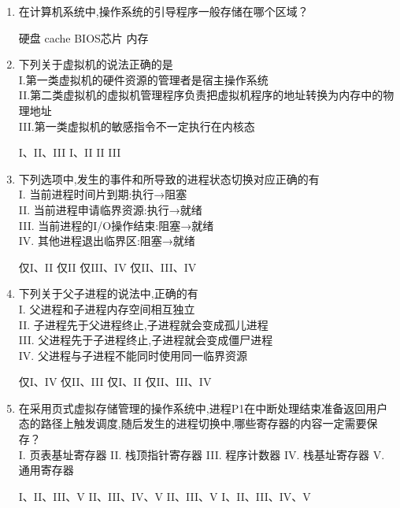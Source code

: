 \documentclass[12pt, a4paper, oneside, UTF8]{ctexbook}
\begin{document}
\begin{enumerate}
    \item 在计算机系统中,操作系统的引导程序一般存储在哪个区域？
    \begin{choices}
    \task 硬盘
    \task cache
    \task BIOS芯片
    \task 内存
    \end{choices}

    \item 下列关于虚拟机的说法正确的是\\
    I.第一类虚拟机的硬件资源的管理者是宿主操作系统\\
    II.第二类虚拟机的虚拟机管理程序负责把虚拟机程序的地址转换为内存中的物理地址\\
    III.第一类虚拟机的敏感指令不一定执行在内核态
    \begin{choices}
    \task I、II、III
    \task I、II
    \task II
    \task III
    \end{choices}

    \item 下列选项中,发生的事件和所导致的进程状态切换对应正确的有\\
    I. 当前进程时间片到期:执行→阻塞\\
    II. 当前进程申请临界资源:执行→就绪\\
    III. 当前进程的I/O操作结束:阻塞→就绪\\
    IV. 其他进程退出临界区:阻塞→就绪
    \begin{choices}
    \task 仅I、II
    \task 仅II
    \task 仅III、IV
    \task 仅II、III、IV
    \end{choices}

    \item 下列关于父子进程的说法中,正确的有\\
    I. 父进程和子进程内存空间相互独立\\
    II. 子进程先于父进程终止,子进程就会变成孤儿进程\\
    III. 父进程先于子进程终止,子进程就会变成僵尸进程\\
    IV. 父进程与子进程不能同时使用同一临界资源
    \begin{choices}
    \task 仅I、IV
    \task 仅II、III
    \task 仅I、II
    \task 仅II、III、IV
    \end{choices}

    \item 在采用页式虚拟存储管理的操作系统中,进程P1在中断处理结束准备返回用户态的路径上触发调度,随后发生的进程切换中,哪些寄存器的内容一定需要保存？\\
    I. 页表基址寄存器\quad
    II. 栈顶指针寄存器\quad
    III. 程序计数器\quad
    IV. 栈基址寄存器\quad
    V. 通用寄存器
    \begin{choices}[2]
    \task I、II、III、V
    \task II、III、IV、V
    \task II、III、V
    \task I、II、III、IV、V
    \end{choices}



\end{enumerate}
\end{document}

